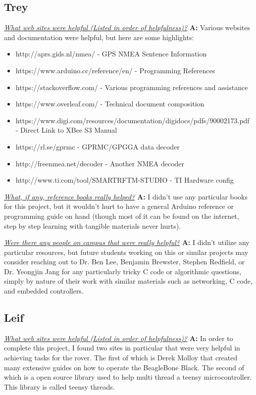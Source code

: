 \documentclass[onecolumn, draftclsnofoot, 10pt, compsoc]{IEEEtran}
\begin{document}
\subsection{Trey}
\textit{\underline{What web sites were helpful (Listed in order of helpfulness)?}}
\newline\textbf{A:} Various websites and documentation were helpful, but here are some highlights:
\begin{itemize}
    \item http://aprs.gids.nl/nmea/ - GPS NMEA Sentence Information
    \item https://www.arduino.cc/reference/en/ - Programming References
    \item https://stackoverflow.com/ - Various programming references and assistance
    \item https://www.overleaf.com/ - Technical document composition
    \item https://www.digi.com/resources/documentation/digidocs/pdfs/90002173.pdf - Direct Link to XBee S3 Manual
    \item https://rl.se/gprmc - GPRMC/GPGGA data decoder
    \item http://freenmea.net/decoder - Another NMEA decoder
    \item http://www.ti.com/tool/SMARTRFTM-STUDIO - TI Hardware config \newline
\end{itemize}

\textit{\underline{What, if any, reference books really helped?}}
\newline\textbf{A:} I didn't use any particular books for this project, but it wouldn't hurt to have a general Arduino reference or programming guide on hand (though most of it can be found on the internet, step by step learning with tangible materials never hurts). \newline

\textit{\underline{Were there any people on campus that were really helpful?}}
\newline\textbf{A:} I didn't utilize any particular resources, but future students working on this or similar projects may consider reaching out to Dr. Ben Lee, Benjamin Brewster, Stephen Redfield, or Dr. Yeongjin Jang for any particularly tricky C code or algorithmic questions, simply by nature of their work with similar materials such as networking, C code, and embedded controllers.\newline

\subsection{Leif}
\textit{\underline{What web sites were helpful (Listed in order of helpfulness)?}}
\newline\textbf{A:}
In order to complete this project, I found two sites in particular that were very helpful in achieving tasks for the rover. The first of which is Derek Molloy that created many extensive guides on how to operate the BeagleBone Black. The second of which is a open source library used to help multi thread a teensy microcontroller. This library is called teensy threads. 
\end{document}

